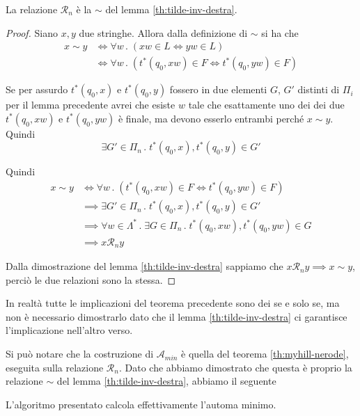 \documentclass[12pt]{article}
\numberwithin{theorem}{subsection}
\begin{document}
\begin{theorem}
	La relazione $\mathcal{R}_n$ è la $\sim$ del lemma \ref{th:tilde-inv-destra}.
\end{theorem}
\begin{proof}
	Siano $x, y$ due stringhe. Allora dalla definizione di $\sim$ si ha che
	\begin{align*}
	x \sim y &\iff \forall w \,.\; (xw \in L \iff yw \in L) \\
	&\iff \forall w \,.\; (t^*(q_0, xw) \in F \iff t^*(q_0, yw) \in F)
	\end{align*}
	
	Se per assurdo $t^*(q_0, x)$ e $t^*(q_0, y)$ fossero in due elementi $G$, $G'$ distinti di $\Pi_i$ per il lemma precedente avrei che esiste $w$ tale che esattamente uno dei dei due $t^*(q_0, xw)$ e $t^*(q_0, yw)$ è finale, ma devono esserlo entrambi perché $x \sim y$. Quindi
	\[
	\exists G' \in \Pi_n \,.\; t^*(q_0, x), t^*(q_0, y) \in G'
	\]
	
	Quindi
	\begin{align*}
		x \sim y &\iff \forall w \,.\; (t^*(q_0, xw) \in F \iff t^*(q_0, yw) \in F)\\
		&\implies \exists G' \in \Pi_n \,.\; t^*(q_0, x), t^*(q_0, y) \in G' \\
		&\implies \forall w \in \Lambda^* \,.\; \exists G \in \Pi_n \,.\; t^*(q_0, xw), t^*(q_0, yw) \in G \\
		&\implies x \mathcal{R}_n y
	\end{align*}
	
	Dalla dimostrazione del lemma \ref{th:tilde-inv-destra} sappiamo che $x \mathcal{R}_n y \implies x \sim y$, perciò le due relazioni sono la stessa.
\end{proof}

\begin{remark}
	In realtà tutte le implicazioni del teorema precedente sono dei se e solo se, ma non è necessario dimostrarlo dato che il lemma \ref{th:tilde-inv-destra} ci garantisce l'implicazione nell'altro verso.
\end{remark}

Si può notare che la costruzione di $\mathcal{A}_{min}$ è quella del teorema \ref{th:myhill-nerode}, eseguita sulla relazione $\mathcal{R}_n$. Dato che abbiamo dimostrato che questa è proprio la relazione $\sim$ del lemma \ref{th:tilde-inv-destra}, abbiamo il seguente

\begin{corollary}
	L'algoritmo presentato calcola effettivamente l'automa minimo.
\end{corollary}
\end{document}
